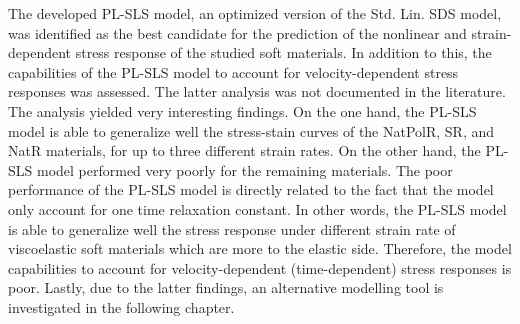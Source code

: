 The developed PL-SLS model, an optimized version of the Std. Lin. SDS model, was identified as the best candidate for the prediction of the nonlinear and strain-dependent stress response of the studied soft materials. In addition to this, the capabilities of the PL-SLS model to account for velocity-dependent stress responses was assessed. The latter analysis was not documented in the literature. The analysis yielded very interesting findings. On the one hand, the PL-SLS model is able to generalize well the stress-stain curves of the NatPolR, SR, and NatR materials, for up to three different strain rates. On the other hand, the PL-SLS model performed very poorly for the remaining materials. The poor performance of the PL-SLS model is directly related to the fact that the model only account for one time relaxation constant. In other words, the PL-SLS model is able to generalize well the stress response under different strain rate of viscoelastic soft materials which are more to the elastic side. Therefore, the model capabilities to account for velocity-dependent (time-dependent) stress responses is poor. Lastly, due to the latter findings, an alternative modelling tool is investigated in the following chapter.